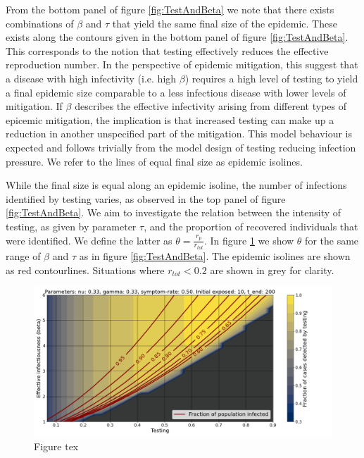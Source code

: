 \documentclass[10pt,a4paper]{article}
\begin{document}
From the bottom panel of figure \ref{fig:TestAndBeta} we note that there exists combinations of $\beta$ and $\tau$ that yield the same final size of the epidemic. 
These exists along the contours given in the bottom panel of figure \ref{fig:TestAndBeta}.
This corresponds to the notion that testing effectively reduces the effective reproduction number. 
In the perspective of epidemic mitigation, this suggest that a disease with high infectivity (i.e. high $\beta$) requires a high level of testing to yield a final epidemic size comparable to a less infectious disease with lower levels of mitigation.
If $\beta$ describes the effective infectivity arising from different types of epicemic mitigation, the implication is that increased testing can make up a reduction in another unspecified part of the mitigation.
This model behaviour is expected and follows trivially from the model design of testing reducing infection pressure.
We refer to the lines of equal final size as epidemic isolines. 

While the final size is equal along an epidemic isoline, the number of infections identified by testing varies, as observed in the top panel of figure \ref{fig:TestAndBeta}.
We aim to investigate the relation between the intensity of testing, as given by parameter $\tau$, and the proportion of recovered individuals that were identified. 
We define the latter as $\theta = \frac{r_p}{r_{tot}}$. 
In figure \ref{fig:TestAndBetaComb} we show $\theta$ for the same range of $\beta$ and $\tau$ as in figure \ref{fig:TestAndBeta}.
The epidemic isolines are shown as red contourlines. Situations where $r_{tot} < 0.2$ are shown in grey for clarity.
\begin{figure}[h]\centering
    \includegraphics[width = \linewidth]{./../Figures/TestingModelling_TestProbAndInfectivity.png}
    \caption{Figure tex}\label{fig:TestAndBetaComb}
\end{figure}
\end{document}
